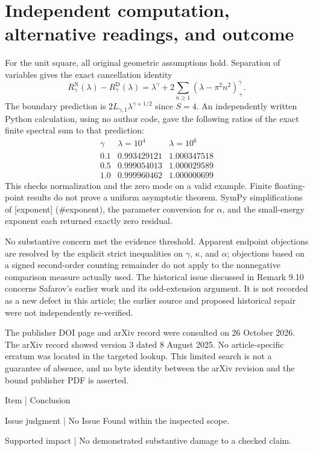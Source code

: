 \documentclass[10pt]{article}
\begin{document}
\section*{Independent computation, alternative readings, and outcome}
For the unit square, all original geometric assumptions hold. Separation of variables gives the exact cancellation identity \[R_\gamma^{\mathrm N}(\lambda)-R_\gamma^{\mathrm D}(\lambda)
 =\lambda^\gamma+2\sum_{n\ge1}(\lambda-\pi^2n^2)_+^\gamma.\] The boundary prediction is \(2L_{\gamma,1}\lambda^{\gamma+1/2}\) since \(S=4\). An independently written Python calculation, using no author code, gave the following ratios of the exact finite spectral sum to that prediction: \[\begin{array}{c|cc}
\gamma&\lambda=10^4&\lambda=10^6\\ \hline
0.1&0.993429121&1.000347518\\
0.5&0.999054013&1.000029589\\
1.0&0.999960462&1.000000699
\end{array}\] This checks normalization and the zero mode on a valid example. Finite floating-point results do not prove a uniform asymptotic theorem. SymPy simplifications of [exponent] (\#exponent), the parameter conversion for \(\alpha\), and the small-energy exponent each returned exactly zero residual.\par
No substantive concern met the evidence threshold. Apparent endpoint objections are resolved by the explicit strict inequalities on \(\gamma\), \(\kappa\), and \(\alpha\); objections based on a signed second-order counting remainder do not apply to the nonnegative comparison measure actually used. The historical issue discussed in Remark 9.10 concerns Safarov’s earlier work and its odd-extension argument. It is not recorded as a new defect in this article; the earlier source and proposed historical repair were not independently re-verified.\par
The publisher DOI page and arXiv record were consulted on 26 October 2026. The arXiv record showed version 3 dated 8 August 2025. No article-specific erratum was located in the targeted lookup. This limited search is not a guarantee of absence, and no byte identity between the arXiv revision and the bound publisher PDF is asserted.\par
Item | Conclusion\par
Issue judgment | No Issue Found within the inspected scope.\par
Supported impact | No demonstrated substantive damage to a checked claim.\par
\end{document}
